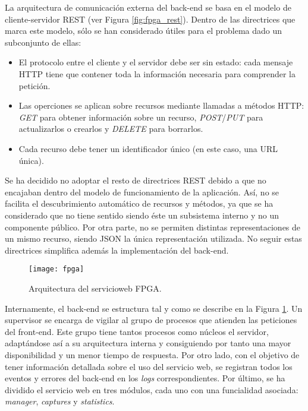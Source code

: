 La arquitectura de comunicación externa del \gls{back-end} se basa en el modelo de cliente-servidor \gls{REST} (ver Figura \ref{fig:fpga_rest}). Dentro de las directrices que marca este modelo, sólo se han considerado útiles para el problema dado un subconjunto de ellas:
\begin{itemize}
  \item El protocolo entre el cliente y el servidor debe ser sin estado: cada mensaje \gls{HTTP} tiene que contener toda la información necesaria para comprender la petición.
  \item Las operciones se aplican sobre recursos mediante llamadas a métodos \gls{HTTP}: \textit{GET} para obtener información sobre un recurso, \textit{POST}/\textit{PUT} para actualizarlos o crearlos y \textit{DELETE} para borrarlos.
  \item Cada recurso debe tener un identificador único (en este caso, una \gls{URL} única).
\end{itemize}

Se ha decidido no adoptar el resto de directrices \gls{REST} debido a que no encajaban dentro del modelo de funcionamiento de la aplicación.
Así, no se facilita el descubrimiento automático de recursos y métodos, ya que se ha considerado que no tiene sentido siendo éste un subsistema interno y no un componente público.
Por otra parte, no se permiten distintas representaciones de un mismo recurso, siendo \gls{JSON} la única representación utilizada.
No seguir estas directrices simplifica además la implementación del \gls{back-end}.

\begin{figure}[!htp]
  \centering
  \texttt{[image: fpga]}
  \caption{Arquitectura del \gls{servicioweb} \gls{FPGA}.}
  \label{fig:arquitectura_servicio}
\end{figure}

Internamente, el \gls{back-end} se estructura tal y como se describe en la Figura \ref{fig:arquitectura_servicio}.
Un supervisor se encarga de vigilar al grupo de procesos que atienden las peticiones del \gls{front-end}.
Este grupo tiene tantos procesos como núcleos el servidor, adaptándose así a su arquitectura interna y consiguiendo por tanto una mayor disponibilidad y un menor tiempo de respuesta.
Por otro lado, con el objetivo de tener información detallada sobre el uso del servicio web, se registran todos los eventos y errores del \gls{back-end} en los \textit{logs} correspondientes.
Por último, se ha dividido el servicio web en tres módulos, cada uno con una funcialidad asociada: \textit{manager}, \textit{captures} y \textit{statistics}.

